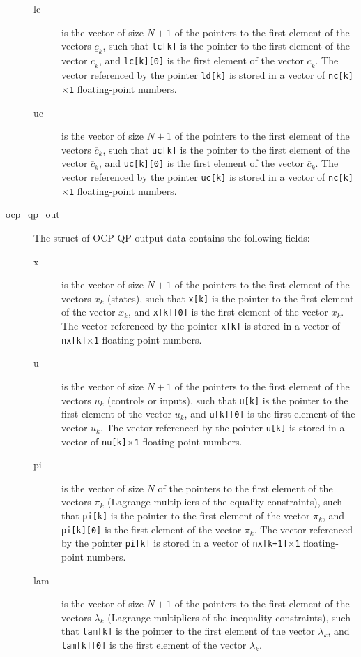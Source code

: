 \documentclass{report}
\begin{document}
\begin{description}
\begin{description}
		\item[lc] is the vector of size $N+1$ of the pointers to the first element of the vectors $\underline c_k$, such that \texttt{lc[k]} is the pointer to the first element of the vector $\underline c_k$, and \texttt{lc[k][0]} is the first element of the vector $\underline c_k$.
		The vector referenced by the pointer \texttt{ld[k]} is stored in a vector of \texttt{nc[k]$\times$1} floating-point numbers.
		\item[uc] is the vector of size $N+1$ of the pointers to the first element of the vectors $\overline c_k$, such that \texttt{uc[k]} is the pointer to the first element of the vector $\overline c_k$, and \texttt{uc[k][0]} is the first element of the vector $\overline c_k$.
		The vector referenced by the pointer \texttt{uc[k]} is stored in a vector of \texttt{nc[k]$\times$1} floating-point numbers.
	\end{description}
	\item[ocp\_qp\_out] The struct of OCP QP output data contains the following fields:
	\begin{description}
		\item[x] is the vector of size $N+1$ of the pointers to the first element of the vectors $x_k$ (states), such that \texttt{x[k]} is the pointer to the first element of the vector $x_k$, and \texttt{x[k][0]} is the first element of the vector $x_k$.
		The vector referenced by the pointer \texttt{x[k]} is stored in a vector of \texttt{nx[k]$\times$1} floating-point numbers.
		\item[u] is the vector of size $N+1$ of the pointers to the first element of the vectors $u_k$ (controls or inputs), such that \texttt{u[k]} is the pointer to the first element of the vector $u_k$, and \texttt{u[k][0]} is the first element of the vector $u_k$.
		The vector referenced by the pointer \texttt{u[k]} is stored in a vector of \texttt{nu[k]$\times$1} floating-point numbers.
		\item[pi] is the vector of size $N$ of the pointers to the first element of the vectors $\pi_k$ (Lagrange multipliers of the equality constraints), such that \texttt{pi[k]} is the pointer to the first element of the vector $\pi_k$, and \texttt{pi[k][0]} is the first element of the vector $\pi_k$.
		The vector referenced by the pointer \texttt{pi[k]} is stored in a vector of \texttt{nx[k+1]$\times$1} floating-point numbers.
		\item[lam] is the vector of size $N+1$ of the pointers to the first element of the vectors $\lambda_k$ (Lagrange multipliers of the inequality constraints), such that \texttt{lam[k]} is the pointer to the first element of the vector $\lambda_k$, and \texttt{lam[k][0]} is the first element of the vector $\lambda_k$.

\end{description}
\end{description}
\end{document}
